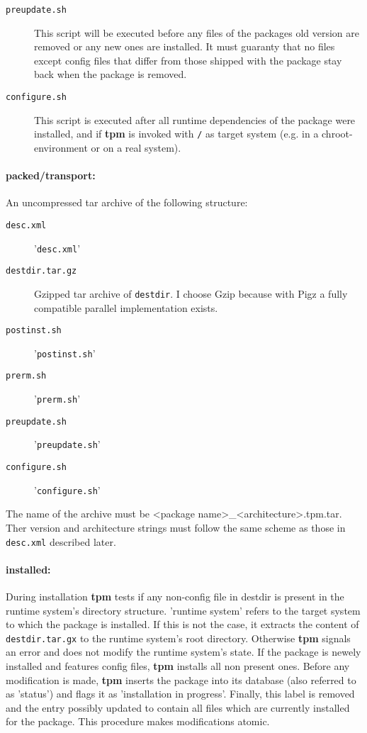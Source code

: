 \documentclass[a4paper]{article}
\newcommand{\file}[1]{\texttt{#1}}
\newcommand{\program}[1]{\textbf{#1}}
\begin{document}
\begin{description}
		\item[\file{preupdate.sh}] This script will be executed before any files of the packages old version are removed or any new ones are installed. It must guaranty that no files except config files that differ from those shipped with the package stay back when the package is removed.
		
		\item[\file{configure.sh}] This script is executed after all runtime dependencies of the package were installed, and if \program{tpm} is invoked with \file{/} as target system (e.g. in a chroot-environment or on a real system).
	\end{description}

	\paragraph{packed/transport:}
	An uncompressed tar archive of the following structure:
	\begin{description}
		\item[\file{desc.xml}] '\file{desc.xml}'
		
		\item[\file{destdir.tar.gz}] Gzipped tar archive of \file{destdir}. I choose Gzip because with Pigz a fully compatible parallel implementation exists.
		
		\item[\file{postinst.sh}] '\file{postinst.sh}'
		
		\item[\file{prerm.sh}] '\file{prerm.sh}'
		
		\item[\file{preupdate.sh}] '\file{preupdate.sh}'
		
		\item[\file{configure.sh}] '\file{configure.sh}'
	\end{description}
	
	\noindent
	The name of the archive must be <package name>\_<architecture>.tpm.tar. Ther version and architecture strings must follow the same scheme as those in \file{desc.xml} described later.
	
	\paragraph{installed:}
	During installation \program{tpm} tests if any non-config file in destdir is present in the runtime system's directory structure. 'runtime system' refers to the target system to which the package is installed. If this is not the case, it extracts the content of \file{destdir.tar.gx} to the runtime system's root directory. Otherwise \program{tpm} signals an error and does not modify the runtime system's state. If the package is newely installed and features config files, \program{tpm} installs all non present ones. Before any modification is made, \program{tpm} inserts the package into its database (also referred to as 'status') and flags it as 'installation in progress'. Finally, this label is removed and the entry possibly updated to contain all files which are currently installed for the package. This procedure makes modifications atomic.
	
\end{document}
